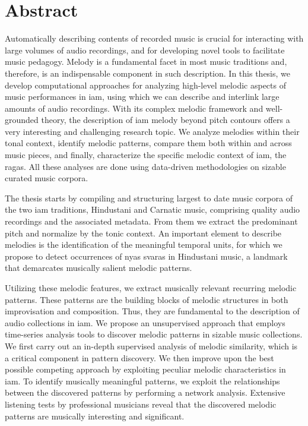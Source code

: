 
\chapter{Abstract}

Automatically describing contents of recorded music is crucial for interacting with large volumes of audio recordings, and for developing novel tools to facilitate music pedagogy. Melody is a fundamental facet in most music traditions and, therefore, is an indispensable component in such description. In this thesis, we develop computational approaches for analyzing high-level melodic aspects of music performances in \gls{iam}, using which we can describe and interlink large amounts of audio recordings. With its complex melodic framework and well-grounded theory, the description of \gls{iam} melody beyond pitch contours offers a very interesting and challenging research topic. We analyze melodies within their tonal context, identify melodic patterns, compare them both within and across music pieces, and finally, characterize the specific melodic context of \gls{iam}, the \glspl{raga}. All these analyses are done using data-driven methodologies on sizable curated music corpora.

The thesis starts by compiling and structuring largest to date music corpora of the two \gls{iam} traditions, Hindustani and Carnatic music, comprising quality audio recordings and the associated metadata. From them we extract the predominant pitch and normalize by the tonic context. An important element to describe melodies is the identification of the meaningful temporal units, for which we propose to detect occurrences of \gls{nyas} \glspl{svara} in Hindustani music, a landmark that demarcates musically salient melodic patterns.

Utilizing these melodic features, we extract musically relevant recurring melodic patterns. These patterns are the building blocks of melodic structures in both improvisation and composition. Thus, they are fundamental to the description of audio collections in \gls{iam}. We propose an unsupervised approach that employs time-series analysis tools to discover melodic patterns in sizable music collections. We first carry out an in-depth supervised analysis of melodic similarity, which is a critical component in pattern discovery. We then improve upon the best possible competing approach by exploiting peculiar melodic characteristics in \gls{iam}. To identify musically meaningful patterns, we exploit the relationships between the discovered patterns by performing a network analysis. Extensive listening tests by professional musicians reveal that the discovered melodic patterns are musically interesting and significant.

